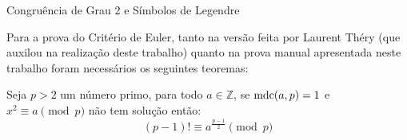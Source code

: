 \begin{frame}[fragile]{Congruência de Grau 2 e Símbolos de Legendre}

    Para a prova do Critério de Euler, tanto na versão feita por Laurent Théry (que auxilou na realização deste trabalho) quanto na prova manual apresentada neste trabalho foram necessários os seguintes teoremas: 

    \begin{lema} \label{lema : modp-1fat}
    Seja $p > 2$ um número primo, para todo $a \in \mathbb{Z}$, se $\operatorname{mdc}(a, p) = 1$ e $x^2 \equiv a \pmod p$ não tem solução então:
        \begin{equation*}
            (p - 1)! \equiv a^{\frac{p-1}{2}} \pmod{p}
        \end{equation*}
    \end{lema}

        

\end{frame}


